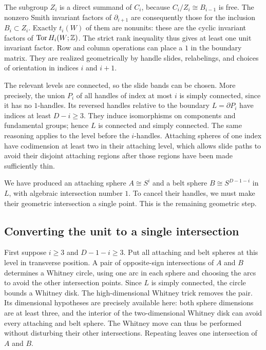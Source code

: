 The subgroup $Z_i$ is a direct summand of $C_i$, because
$C_i/Z_i\cong B_{i-1}$ is free.  The nonzero Smith invariant factors of
$\partial_{i+1}$ are consequently those for the inclusion
$B_i\subset Z_i$.  Exactly $t_i(W)$ of them are nonunits: these are the
cyclic invariant factors of $\operatorname{Tor} H_i(W;\mathbb Z)$.  The strict rank inequality
thus gives at least one unit invariant factor.  Row and column operations
can place a $1$ in the boundary matrix.  They are realized geometrically
by handle slides, relabelings, and choices of orientation in indices $i$
and $i+1$.

The relevant levels are connected, so the slide bands can be chosen.
More precisely, the union $P_i$ of all handles of index at most $i$ is
simply connected, since it has no $1$-handles.  Its reversed handles
relative to the boundary $L=\partial P_i$ have indices at least
$D-i\geq3$.  They induce isomorphisms on components and fundamental
groups; hence $L$ is connected and simply connected.  The same reasoning
applies to the level before the $i$-handles.  Attaching spheres of one
index have codimension at least two in their attaching level, which
allows slide paths to avoid their disjoint attaching regions after those
regions have been made sufficiently thin.

We have produced an attaching sphere $A\cong S^i$ and a belt sphere
$B\cong S^{D-1-i}$ in $L$, with algebraic intersection number $1$.
To cancel their handles, we must make their geometric intersection a
single point.  This is the remaining geometric step.

\subsection{Converting the unit to a single intersection}

First suppose $i\geq3$ and $D-1-i\geq3$.  Put all attaching and belt
spheres at this level in transverse position.  A pair of opposite-sign
intersections of $A$ and $B$ determines a Whitney circle, using one arc
in each sphere and choosing the arcs to avoid the other intersection
points.  Since $L$ is simply connected, the circle bounds a Whitney
disk.  The high-dimensional Whitney trick
\cite[Theorem~6.6]{Milnor1965} removes the pair.  Its
dimensional hypotheses are precisely available here: both sphere
dimensions are at least three, and the interior of the two-dimensional
Whitney disk can avoid every attaching and belt sphere.  The Whitney
move can thus be performed without disturbing their other intersections.
Repeating leaves one intersection of $A$ and $B$.

